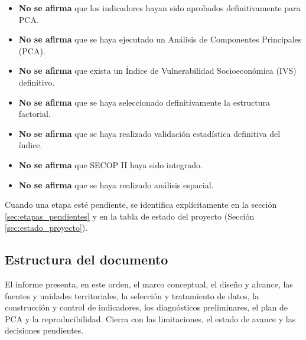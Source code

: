 \begin{itemize}
    \item \textbf{No se afirma} que los indicadores hayan sido aprobados definitivamente para PCA.
    \item \textbf{No se afirma} que se haya ejecutado un Análisis de Componentes Principales (PCA).
    \item \textbf{No se afirma} que exista un Índice de Vulnerabilidad Socioeconómica (IVS) definitivo.
    \item \textbf{No se afirma} que se haya seleccionado definitivamente la estructura factorial.
    \item \textbf{No se afirma} que se haya realizado validación estadística definitiva del índice.
    \item \textbf{No se afirma} que SECOP II haya sido integrado.
    \item \textbf{No se afirma} que se haya realizado análisis espacial.
\end{itemize}

Cuando una etapa esté pendiente, se identifica explícitamente en la sección \ref{sec:etapas_pendientes} y en la tabla de estado del proyecto (Sección \ref{sec:estado_proyecto}).

\subsection{Estructura del documento}

El informe presenta, en este orden, el marco conceptual, el diseño y alcance, las fuentes y unidades territoriales, la selección y tratamiento de datos, la construcción y control de indicadores, los diagnósticos preliminares, el plan de PCA y la reproducibilidad. Cierra con las limitaciones, el estado de avance y las decisiones pendientes.

